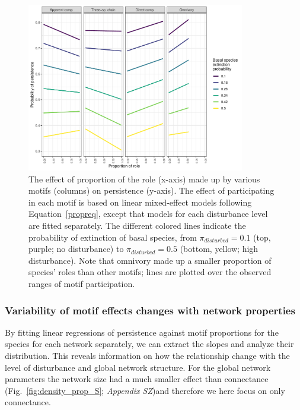 \documentclass[12pt]{article}
\begin{document}
\begin{spacing}{2.0}
            \begin{figure}[h!]
                \centering
                \includegraphics[width=0.85\textwidth]{figures/prop_lmer_allCS.pdf}
                \caption{The effect of proportion of the role (x-axis) made up by various motifs (columns) on persistence (y-axis). The effect of participating in each motif is based on linear mixed-effect models following Equation~\ref{propreq}, except that models for each  disturbance level are fitted separately. The different colored lines indicate the probability of extinction of basal species, from $\pi_{disturbed} = 0.1$ (top, purple; no disturbance) to $\pi_{disturbed} = 0.5$ (bottom, yellow; high disturbance). Note that omnivory made up a smaller proportion of species' roles than other motifs; lines are plotted over the observed ranges of motif participation.}
                \label{fig:prop_lmer_all}
            \end{figure}
        
        \clearpage
    
        \subsubsection*{Variability of motif effects changes with network properties}

            By fitting linear regressions of persistence against motif proportions for the species for each network separately, we can extract the slopes and analyze their distribution. This reveals information on how the relationship change with the level of disturbance and global network structure. For the global network parameters the network size had a much smaller effect than connectance (Fig.~\ref{fig:density_prop_S}; \emph{Appendix SZ})and therefore we here focus on only connectance. 
            

\end{spacing}
\end{document}
